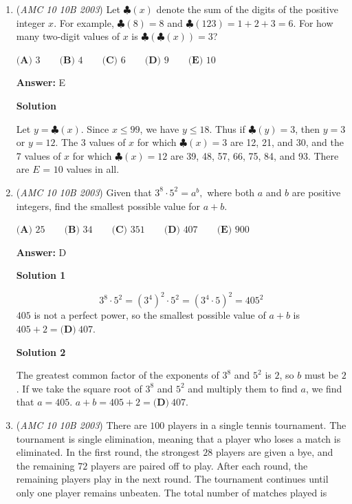 \begin{enumerate}
 -jb2015007

 


	\item (\textit{AMC 10 10B 2003}) Let $\clubsuit(x)$ denote the sum of the digits of the positive integer $x$. For example, $\clubsuit(8)=8$ and $\clubsuit(123)=1+2+3=6$. For how many two-digit values of $x$ is $\clubsuit(\clubsuit(x))=3$?


 $\textbf{(A) } 3 \qquad\textbf{(B) } 4 \qquad\textbf{(C) } 6 \qquad\textbf{(D) } 9 \qquad\textbf{(E) } 10$

 \textbf{Answer: }E



\textbf{Solution}

Let $y=\clubsuit (x)$. Since $x \leq 99$, we have $y \leq 18$. Thus if $\clubsuit (y)=3$, then $y=3$ or $y=12$. The 3 values of $x$ for which $\clubsuit (x)=3$ are 12, 21, and 30, and the 7 values of $x$ for which $\clubsuit (x)=12$ are 39, 48, 57, 66, 75, 84, and 93. There are $\boxed{E}$ = $\boxed{10}$ values in all.

 


	\item (\textit{AMC 10 10B 2003}) Given that $3^8\cdot5^2=a^b,$ where both $a$ and $b$ are positive integers, find the smallest possible value for $a+b$.


 $\textbf{(A) } 25 \qquad\textbf{(B) } 34 \qquad\textbf{(C) } 351 \qquad\textbf{(D) } 407 \qquad\textbf{(E) } 900$

 \textbf{Answer: }D



\textbf{Solution 1}


 \[3^8\cdot5^2 = (3^4)^2\cdot5^2 = (3^4\cdot5)^2 = 405^2\]
$405$ is not a perfect power, so the smallest possible value of $a+b$ is $405+2=\boxed{\textbf{(D)}\ 407}$.

 



\textbf{Solution 2}

The greatest common factor of the exponents of $3^8$ and $5^2$ is $2$, so $b$ must be $2$. If we take the square root of $3^8$ and $5^2$ and multiply them to find $a$, we find that $a=405$. $a+b = 405+2 = \boxed{\textbf{(D)}\ 407}$.

 


	\item (\textit{AMC 10 10B 2003}) There are $100$ players in a single tennis tournament. The tournament is single elimination, meaning that a player who loses a match is eliminated. In the first round, the strongest $28$ players are given a bye, and the remaining $72$ players are paired off to play. After each round, the remaining players play in the next round. The tournament continues until only one player remains unbeaten. The total number of matches played is



\end{enumerate}
